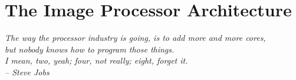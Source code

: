 \chapter{The Image Processor Architecture}\label{ch:fpga}

\begin{flushright}{\slshape
    The way the processor industry is going, is to add more and more cores,\\
    but nobody knows how to program those things.\\
    I mean, two, yeah; four, not really; eight, forget it.\\ \medskip
    -- Steve Jobs}
\end{flushright}







